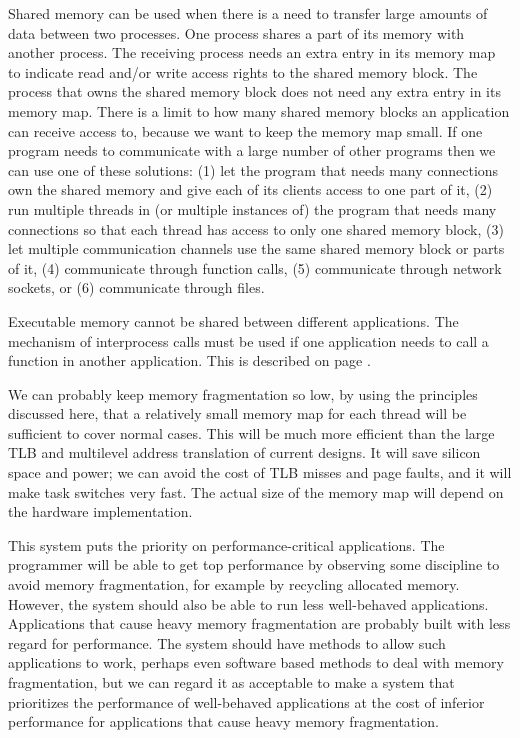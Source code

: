 \documentclass[forwardcom.tex]{subfiles}
\begin{document}
\label{sharedMemory}
Shared memory can be used when there is a need to transfer large amounts of data between two processes. One process shares a part of its memory with another process. The receiving process needs an extra entry in its memory map to indicate read and/or write access rights to the shared memory block. The process that owns the shared memory block does not need any extra entry in its memory map. There is a limit to how many shared memory blocks an application can receive access to, because we want to keep the memory map small. If one program needs to communicate with a large number of other programs then we can use one of these solutions: (1) let the program that needs many connections own the shared memory and give each of its clients access to one part of it, (2) run multiple threads in (or multiple instances of) the program that needs many connections so that each thread has access to only one shared memory block, (3) let multiple communication channels use the same shared memory block or parts of it, (4) communicate through function calls, (5) communicate through network sockets, or (6) communicate through files. 
\vspace{2mm}

Executable memory cannot be shared between different applications. The mechanism of interprocess calls must be used if one application needs to call a function in another application. This is described on page \pageref{interProcessCalls}. 
\vspace{2mm}

We can probably keep memory fragmentation so low, by using the principles discussed here, that a relatively small memory map for each thread will be sufficient to cover normal cases. This will be much more efficient than the large TLB and multilevel address translation of current designs. It will save silicon space and power; we can avoid the cost of TLB misses and page faults, and it will make task switches very fast. The actual size of the memory map will depend on the hardware implementation.
\vspace{2mm}

This system puts the priority on performance-critical applications. The programmer will be able to get top performance by observing some discipline to avoid memory fragmentation, for example by recycling allocated memory. However, the system should also be able to run less well-behaved applications. Applications that cause heavy memory fragmentation are probably built with less regard for performance. The system should have methods to allow such applications to work, perhaps even software based methods to deal with memory fragmentation, but we can regard it as acceptable to make a system that prioritizes the performance of well-behaved applications at the cost of inferior performance for applications that cause heavy memory fragmentation.
\end{document}
